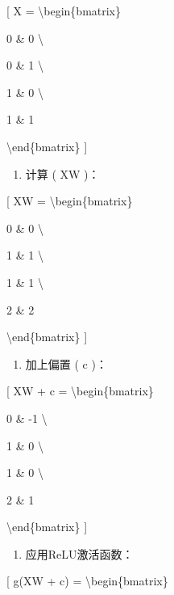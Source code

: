 {[} X = \textbackslash begin\{bmatrix\}

0 \& 0 \textbackslash{}

0 \& 1 \textbackslash{}

1 \& 0 \textbackslash{}

1 \& 1

\textbackslash end\{bmatrix\} {]}


\begin{enumerate}
\def\labelenumi{\arabic{enumi}.}
\item
  计算 ( XW )：
\end{enumerate}

{[} XW = \textbackslash begin\{bmatrix\}

0 \& 0 \textbackslash{}

1 \& 1 \textbackslash{}

1 \& 1 \textbackslash{}

2 \& 2

\textbackslash end\{bmatrix\} {]}


\begin{enumerate}
\def\labelenumi{\arabic{enumi}.}
\item
  加上偏置 ( c )：
\end{enumerate}

{[} XW + c = \textbackslash begin\{bmatrix\}

0 \& -1 \textbackslash{}

1 \& 0 \textbackslash{}

1 \& 0 \textbackslash{}

2 \& 1


\textbackslash end\{bmatrix\} {]}

\begin{enumerate}
\def\labelenumi{\arabic{enumi}.}
\item
  应用ReLU激活函数：
\end{enumerate}

{[} g(XW + c) = \textbackslash begin\{bmatrix\}


